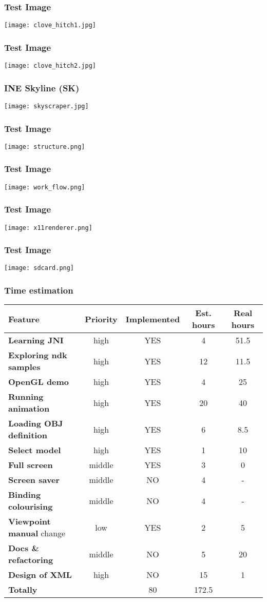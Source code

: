 
\begin{frame}\frametitle{Test Image} 
\texttt{[image: clove\_hitch1.jpg]}
\end{frame}

\begin{frame}\frametitle{Test Image} 
\texttt{[image: clove\_hitch2.jpg]}
\end{frame}

\begin{frame} \frametitle{INE Skyline (SK)} 
  \texttt{[image: skyscraper.jpg]}
\end{frame}

\begin{frame}\frametitle{Test Image} 
\texttt{[image: structure.png]}
\end{frame}

\begin{frame}\frametitle{Test Image} 
\texttt{[image: work\_flow.png]}
\end{frame}

\begin{frame}\frametitle{Test Image} 
\texttt{[image: x11renderer.png]}
\end{frame}

\begin{frame}\frametitle{Test Image} 
\texttt{[image: sdcard.png]}
\end{frame}

\begin{frame}\frametitle{Time estimation} 
\begin{tabular}{| l || c | c |  c | c |}
\hline
Feature & Priority & Implemented & Est. hours & Real hours\\
\hline
\hline
\textbf{Learning JNI} & high & YES &                 4 & 51.5\\
\textbf{Exploring ndk samples} & high & YES &       12 & 11.5\\
\textbf{OpenGL demo} & high & YES &                  4 & 25\\
\textbf{Running animation} & high & YES &           20 & 40\\
\textbf{Loading OBJ definition} & high & YES &       6 &  8.5\\
\textbf{Select model} & high & YES &                 1 & 10\\
\textbf{Full screen} & middle & YES &                3 &  0\\
\textbf{Screen saver} & middle & NO &                4 &  -\\
\textbf{Binding colourising} & middle & NO &         4 & -\\
\textbf{Viewpoint manual} change & low & YES &       2 & 5\\
\textbf{Docs \& refactoring} & middle & NO &         5 & 20\\
\textbf{Design of XML} & high & NO &                15 & 1\\
\hline
\textbf{Totally} & &                                80 & 172.5 \\
\hline
\end{tabular}

\end{frame}

